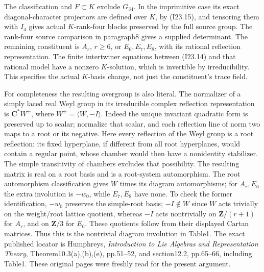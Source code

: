The classification and \(F\subset K\) exclude \(G_{34}\).
In the imprimitive case its exact diagonal-character projectors
are defined over \(K\), by (I23.15), and tensoring them with
\(I_4\) gives actual \(K\)-rank-four blocks preserved by the
full source group. The rank-four source comparison in paragraph8
gives a supplied determinant. The remaining constituent is
\(A_r\), \(r\ge6\), or \(E_6,E_7,E_8\), with its rational
reflection representation. The finite intertwiner equations
between (I23.14) and that rational model have a nonzero
\(K\)-solution, which is invertible by irreducibility.
This specifies the actual \(K\)-basis change, not just the
constituent's trace field.

For completeness the resulting overgroup is also literal.
The normalizer of a simply laced real Weyl group in its
irreducible complex reflection representation is
\(\mathbf C^*W^{\pm}\), where \(W^{\pm}=\langle W,-I\rangle\).
Indeed the unique invariant quadratic form is preserved up to
scalar; normalize that scalar, and each reflection line of norm
two maps to a root or its negative. Here every reflection of the
Weyl group is a root reflection: its fixed hyperplane, if different
from all root hyperplanes, would contain a regular point, whose
chamber would then have a nonidentity stabilizer. The simple
transitivity of chambers excludes that possibility. The resulting matrix is real
on a root basis and is a root-system automorphism. The root
automorphism classification gives \(W\) times its diagram
automorphisms; for \(A_r,E_6\) the extra involution is
\(-w_0\), while \(E_7,E_8\) have none. To check the former
identification, \(-w_0\) preserves the simple-root basis;
\(-I\notin W\) since \(W\) acts trivially on the weight/root
lattice quotient, whereas \(-I\) acts nontrivially on
\(\mathbf Z/(r+1)\) for \(A_r\), and on \(\mathbf Z/3\)
for \(E_6\). These quotients follow from their displayed Cartan
matrices. Thus this is the nontrivial diagram involution in Table1.
The exact published
locator is Humphreys, \emph{Introduction to Lie Algebras and
Representation Theory}, Theorem10.3(a),(b),(e), pp.51--52,
and section12.2, pp.65--66, including Table1.
These original pages were freshly read for the present argument.

